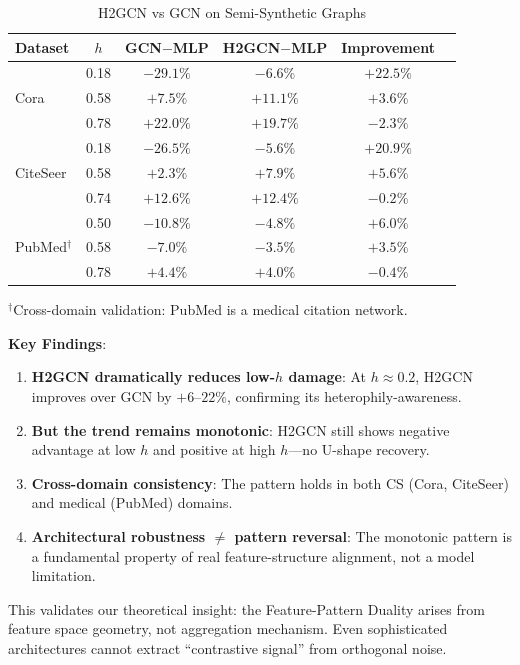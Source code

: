 \begin{table}[t]
\centering
\caption{H2GCN vs GCN on Semi-Synthetic Graphs}
\label{tab:h2gcn_semi}
\begin{tabular}{@{}lccccc@{}}
\toprule
\textbf{Dataset} & \textbf{$h$} & \textbf{GCN$-$MLP} & \textbf{H2GCN$-$MLP} & \textbf{Improvement} \\
\midrule
\multirow{3}{*}{Cora} & 0.18 & $-29.1\%$ & $-6.6\%$ & $+22.5\%$ \\
 & 0.58 & $+7.5\%$ & $+11.1\%$ & $+3.6\%$ \\
 & 0.78 & $+22.0\%$ & $+19.7\%$ & $-2.3\%$ \\
\midrule
\multirow{3}{*}{CiteSeer} & 0.18 & $-26.5\%$ & $-5.6\%$ & $+20.9\%$ \\
 & 0.58 & $+2.3\%$ & $+7.9\%$ & $+5.6\%$ \\
 & 0.74 & $+12.6\%$ & $+12.4\%$ & $-0.2\%$ \\
\midrule
\multirow{3}{*}{PubMed$^\dag$} & 0.50 & $-10.8\%$ & $-4.8\%$ & $+6.0\%$ \\
 & 0.58 & $-7.0\%$ & $-3.5\%$ & $+3.5\%$ \\
 & 0.78 & $+4.4\%$ & $+4.0\%$ & $-0.4\%$ \\
\bottomrule
\end{tabular}
\vspace{1mm}
\raggedright\small $^\dag$Cross-domain validation: PubMed is a medical citation network.
\end{table}

\textbf{Key Findings}:
\begin{enumerate}
    \item \textbf{H2GCN dramatically reduces low-$h$ damage}: At $h \approx 0.2$, H2GCN improves over GCN by $+6$--$22\%$, confirming its heterophily-awareness.
    \item \textbf{But the trend remains monotonic}: H2GCN still shows negative advantage at low $h$ and positive at high $h$---no U-shape recovery.
    \item \textbf{Cross-domain consistency}: The pattern holds in both CS (Cora, CiteSeer) and medical (PubMed) domains.
    \item \textbf{Architectural robustness $\neq$ pattern reversal}: The monotonic pattern is a fundamental property of real feature-structure alignment, not a model limitation.
\end{enumerate}

This validates our theoretical insight: the Feature-Pattern Duality arises from feature space geometry, not aggregation mechanism. Even sophisticated architectures cannot extract ``contrastive signal'' from orthogonal noise.

